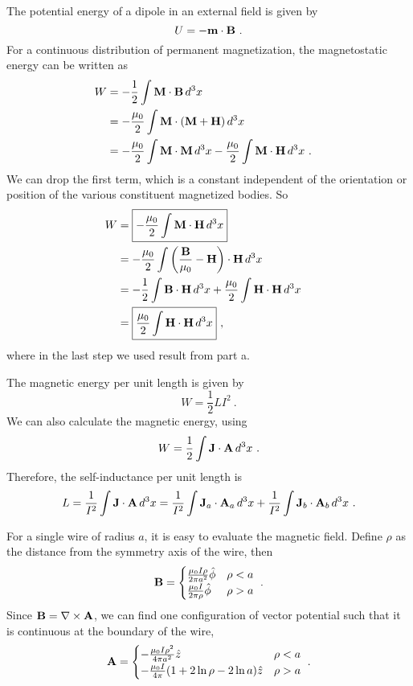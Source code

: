 \documentclass[12pt]{article}
\newcommand{\B}{{\bf B}}
\newcommand{\bJ}{{\bf J}}
\newcommand{\A}{{\bf A}}
\begin{document}
The potential energy of a dipole in an external field is given by
\begin{equation}
    U = - {\bf m} \cdot \B~.
\end{equation}
For a continuous distribution of permanent magnetization, the magnetostatic energy can be written as
\begin{align}
    W &= - \frac{1}{2} \int {\bf M} \cdot \B\, d^3 x \cr
      &= -\frac{\mu_0}{2} \int {\bf M} \cdot ({\bf M} + {\bf H})\, d^3 x\cr
      &= -\frac{\mu_0}{2} \int {\bf M} \cdot {\bf M} \, d^3x - \frac{\mu_0}{2} \int {\bf M} \cdot {\bf H}\, d^3 x~.
\end{align}
We can drop the first term, which is a constant independent of the orientation or position of the various constituent magnetized bodies. So
\begin{align}
    W &= \boxed{- \frac{\mu_0}{2} \int {\bf M} \cdot {\bf H} \, d^3x}\cr
      &= - \frac{\mu_0}{2} \int \left(\frac{\B}{\mu_0} - {\bf H}\right) \cdot {\bf H}\, d^3 x\cr
      &=-\frac{1}{2} \int {\B} \cdot {\bf H} \, d^3x + \frac{\mu_0}{2} \int {\bf H} \cdot {\bf H}\, d^3 x\cr
      &=\boxed{\frac{\mu_0}{2} \int {\bf H} \cdot {\bf H}\, d^3x }~,
\end{align}
where in the last step we used result from part a.

\newpage
{} The magnetic energy per unit length is given by
\begin{equation}
    W = \frac{1}{2}L I^2~.
\end{equation}
We can also calculate the magnetic energy, using
\begin{equation}
    W = \frac{1}{2} \int \bJ\cdot \A \, d^3x~.
\end{equation}
Therefore, the self-inductance per unit length is
\begin{equation}
    L = \frac{1}{I^2} \int \bJ \cdot \A \,d^3 x = \frac{1}{I^2} \int \bJ_a \cdot  \A_a \, d^3 x + \frac{1}{I^2} \int \bJ_b \cdot \A_b\, d^3 x~.
\end{equation}

For a single wire of radius $a$, it is easy to evaluate the magnetic field. Define $\rho$ as the distance from the symmetry axis of the wire, then
\begin{equation}
    \B = \begin{cases}
        \frac{\mu_0 I \rho}{2 \pi a^2}\hat{\phi} & \rho < a \\
        \frac{\mu_0 I}{2\pi \rho} \hat{\phi}& \rho > a
    \end{cases}~.
\end{equation}
Since $\B = \nabla \times \A$, we can find one configuration of vector potential such that it is continuous at the boundary of the wire,
\begin{equation}
    \A = \begin{cases}
        -\frac{\mu_0 I \rho^2}{4\pi a^2} \hat{z} & \rho < a\\
        - \frac{\mu_0 I }{4\pi} (1 + 2\ln\rho- 2\ln a) \hat{z}& \rho > a
    \end{cases}~.
\end{equation}
\end{document}
